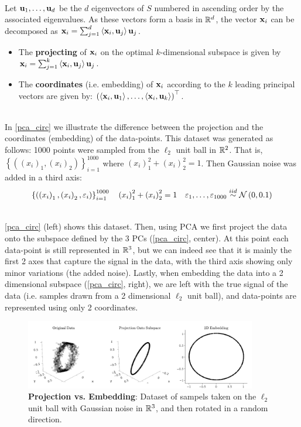 ~\\Let $\mathbf{u}_1,\ldots, \mathbf{u}_d$ be the $d$ eigenvectors of $S$ numbered in ascending order by the associated eigenvalues. As these vectors form a basis in $\mathbb{R}^d$, the vector $\mathbf{x}_i$ can be decomposed as $\mathbf{x}_i = \sum_{j=1}^d \left\langle \mathbf{x}_i,\mathbf{u}_j\right\rangle\mathbf{u}_j$. 
\begin{itemize}
	\item The \textbf{projecting} of $\mathbf{x}_i$ on the optimal $k$-dimensional subspace is given by $\mathbf{x}_i=\sum_{j=1}^k \left\langle \mathbf{x}_i,\mathbf{u}_j\right\rangle\mathbf{u}_j$.
	\item The \textbf{coordinates} (i.e. embedding) of $\mathbf{x}_i$ according to the $k$ leading principal vectors are given by: $\left(\left\langle \mathbf{x}_i,\mathbf{u}_1\right\rangle,\ldots,\left\langle \mathbf{x}_i,\mathbf{u}_k\right\rangle\right)^\top$.
\end{itemize}

~\\In \autoref{pca_circ} we illustrate the difference between the projection and the coordinates (embedding) of the data-points. This dataset was generated as follows: 1000 points were sampled from the $\ell_2$ unit ball in $\mathbb{R}^2$. That is, $\left\{\left(\left(x_i\right)_1, \left(x_i\right)_2\right)\right\}^{1000}_{i=1}$ where $\left(x_i\right)_1^2+\left(x_i\right)_2^2=1$. Then Gaussian noise was added in a third axis: $$\left\{\left(\left(x_i\right)_1, \left(x_i\right)_2, \varepsilon_i\right)\right\}^{1000}_{i=1} \quad \left(x_i\right)_1^2+\left(x_i\right)_2^2=1 \quad \varepsilon_1,\ldots,\varepsilon_{1000}\overset{iid}{\sim}\mathcal{N}\left(0, 0.1\right)$$

~\\ \autoref{pca_circ} (left) shows this dataset. Then, using PCA we first project the data onto the subspace defined by the 3 PCs (\autoref{pca_circ}, center). At this point each data-point is still represented in $\mathbb{R}^3$, but we can indeed see that it is mainly the first 2 axes that capture the signal in the data, with the third axis showing only minor variations (the added noise). Lastly, when embedding the data into a 2 dimensional subspace (\autoref{pca_circ}, right), we are left with the true signal of the data (i.e. samples drawn from a 2 dimensional $\ell_2$ unit ball), and data-points are represented using only 2 coordinates.


\begin{figure}[!h]
	\centering
	\includegraphics[width=0.9\textwidth]{chapters/unsupervised.learning/figures/pca_circ.png}
	\caption{\textbf{Projection vs. Embedding}: Dataset of sampels taken on the $\ell_2$ unit ball with Gaussian noise in $\mathbb{R}^3$, and then rotated in a random direction. \GitChapterSevelExamplesPCA}\label{pca_circ}
\end{figure}


